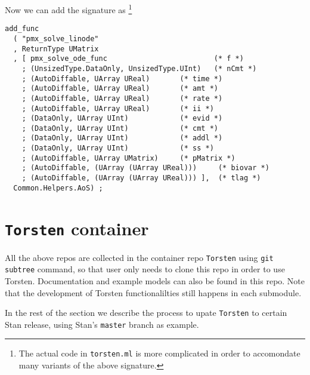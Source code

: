 \documentclass[12pt, reqno, oneside]{amsbook}
\numberwithin{equation}{chapter}
\numberwithin{figure}{chapter}
\numberwithin{table}{chapter}
\theoremstyle{remark}
\begin{document}
Now we can add the signature as \footnote{The actual code in \texttt{torsten.ml} is more complicated in order to
accomondate many variants of the above signature.}
\begin{verbatim}
add_func
  ( "pmx_solve_linode"
  , ReturnType UMatrix
  , [ pmx_solve_ode_func                         (* f *)
    ; (UnsizedType.DataOnly, UnsizedType.UInt)   (* nCmt *)
    ; (AutoDiffable, UArray UReal)       (* time *)
    ; (AutoDiffable, UArray UReal)       (* amt *)
    ; (AutoDiffable, UArray UReal)       (* rate *)
    ; (AutoDiffable, UArray UReal)       (* ii *)
    ; (DataOnly, UArray UInt)            (* evid *)
    ; (DataOnly, UArray UInt)            (* cmt *)
    ; (DataOnly, UArray UInt)            (* addl *)
    ; (DataOnly, UArray UInt)            (* ss *)
    ; (AutoDiffable, UArray UMatrix)     (* pMatrix *)
    ; (AutoDiffable, (UArray (UArray UReal)))     (* biovar *)
    ; (AutoDiffable, (UArray (UArray UReal))) ],  (* tlag *)
  Common.Helpers.AoS) ;
\end{verbatim}

\chapter{\texttt{Torsten} container}
\label{sec:org3d37718}
All the above repos are collected in the container repo
\texttt{Torsten} using \texttt{git subtree} command, so that user only needs to
clone this repo in order to use Torsten. Documentation and example
models can also be found in this repo. Note that the development of
Torsten functionalilties still happens in each submodule.

In the rest of the section we describe the process to upate \texttt{Torsten}
to certain Stan release, using Stan's \texttt{master} branch as example.
\end{document}
